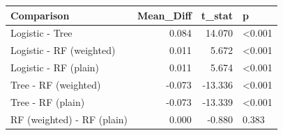 
\begin{tabular}{lrrl}
\toprule
Comparison & Mean\_Diff & t\_stat & p\\
\midrule
Logistic - Tree & 0.084 & 14.070 & <0.001\\
Logistic - RF (weighted) & 0.011 & 5.672 & <0.001\\
Logistic - RF (plain) & 0.011 & 5.674 & <0.001\\
Tree - RF (weighted) & -0.073 & -13.336 & <0.001\\
Tree - RF (plain) & -0.073 & -13.339 & <0.001\\
RF (weighted) - RF (plain) & 0.000 & -0.880 & 0.383\\
\bottomrule
\end{tabular}
